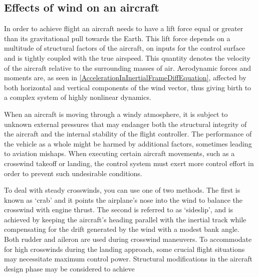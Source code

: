 \documentclass[twocolumn,showpacs,
    nofootinbib,aps,superscriptaddress,
    eqsecnum,prd,showkeys,10pt,floatfix]{revtex4}
\begin{document}
\subsection{Effects of wind on an aircraft}
In order to achieve flight an aircraft needs to have a lift force equal or
greater than its gravitational pull towards the Earth. This lift force depends on a multitude of structural
factors of the aircraft, on inputs for the control surface and is tightly coupled with the true airspeed. 
This quantity denotes the velocity of the
aircraft relative to the surrounding masses of air. Aerodynamic forces and moments are, as seen in {\ref{AccelerationInInertialFrameDiffEquation}}, affected by both
horizontal and vertical components of the wind vector, thus giving birth to a
complex system of highly nonlinear dynamics.
\par
When an aircraft is moving through a windy atmosphere, it is subject to unknown
external pressures that may endanger both the structural integrity of the
aircraft and the internal stability of the flight controller. The performance
of the vehicle as a whole might be harmed by additional factors, sometimes
leading to aviation mishaps. When executing certain aircraft movements, such as
a crosswind takeoff or landing, the control system must exert more control
effort in order to prevent such undesirable conditions.
\par
To deal with steady crosswinds, you can use one of two methods. The first is
known as `crab' and it points the airplane's nose into the wind to balance the
crosswind with engine thrust. The second is referred to as `sideslip', and is
achieved by keeping the aircraft's heading parallel with the inertial track
while compensating for the drift generated by the wind with a modest bank
angle. Both rudder and aileron are used during crosswind maneuvers. To
accommodate for high crosswinds during the landing approach, some crucial
flight situations may necessitate maximum control power. Structural
modifications in the aircraft design phase may be considered to achieve
\end{document}
